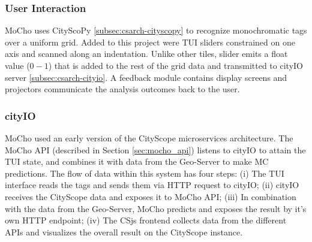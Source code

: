 {{        \subsubsection{User Interaction}
        {
            MoCho uses CityScoPy \eqref{subsec:csarch-cityscopy} to recognize monochromatic tags over a uniform grid. Added to this project were TUI sliders constrained on one axis and scanned along an indentation. Unlike other tiles, slider emits a float value ($0 - 1$) that is added to the rest of the grid data and transmitted to cityIO server \eqref{subsec:csarch-cityio}. A feedback module contains display screens and projectors communicate the analysis outcomes back to the user.
        }
        \subsubsection{cityIO}
        {
            MoCho used an early version of the CityScope microservices architecture. The MoCho API (described in Section \eqref{sec:mocho_api}) listens to cityIO to attain the TUI state, and combines it with data from the Geo-Server to make MC predictions. The flow of data within this system has four steps: (i) The TUI interface reads the tags and sends them via HTTP request to cityIO; (ii) cityIO receives the CityScope data and exposes it to MoCho API; (iii) In combination with the data from the Geo-Server, MoCho predicts and exposes the result by it's own HTTP endpoint; (iv) The CSjs frontend collects data from the different APIs and visualizes the overall result on the CityScope instance.
        }
}}

